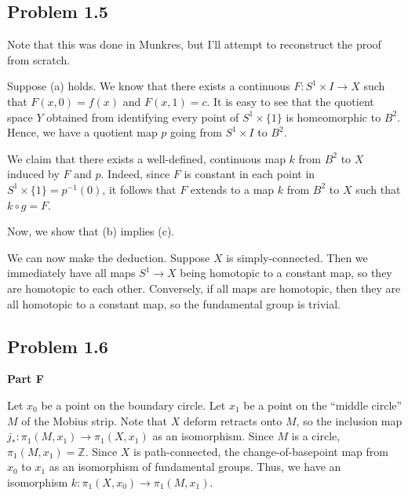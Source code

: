 \documentclass[10pt, oneside]{amsart}
\begin{document}
    \hrulefill

    \newpage

    \hrulefill

    \subsection{Problem 1.5}

    Note that this was done in Munkres, but I'll attempt to reconstruct the proof from scratch.
    \newline

    Suppose (a) holds. We know that there exists a continuous $F : S^{1} \times I \rightarrow X$ such that $F(x, 0) = f(x)$ and $F(x, 1) = c$. It is easy to see that the quotient space $Y$
    obtained from identifying every point of $S^{1} \times \{1\}$ is homeomorphic to $B^2$. Hence, we have a quotient map $p$ going from $S^{1} \times I$ to $B^2$.
    \newline

    We claim that there exists a well-defined, continuous map $k$ from $B^2$ to $X$ induced by $F$ and $p$. Indeed, since $F$ is constant in each point in $S^{1} \times \{1\} = p^{-1}(0)$,
    it follows that $F$ extends to a map $k$ from $B^2$ to $X$ such that $k \circ g = F$.
    \newline

    Now, we show that (b) implies (c).
    \newline

    We can now make the deduction. Suppose $X$ is simply-connected. Then we immediately have all maps $S^1 \rightarrow X$ being homotopic to a constant map, so they are homotopic to each other.
    Conversely, if all maps are homotopic, then they are all homotopic to a constant map, so the fundamental group is trivial.

    \subsection{Problem 1.6}

    \hrulefill

     \textbf{Part F}
    \newline

    Let $x_0$ be a point on the boundary circle. Let $x_1$ be a point on the ``middle circle'' $M$ of the Mobius strip. Note that $X$ deform retracts onto $M$, so the
    inclusion map $j_{*} : \pi_1(M, x_1) \rightarrow \pi_1(X, x_1)$ as an isomorphism. Since $M$ is a circle, $\pi_1(M, x_1) = \mathbb{Z}$.
    Since $X$ is path-connected, the change-of-basepoint map from $x_0$ to $x_1$ as an isomorphism of fundamental groups. Thus, we have an isomorphism $k : \pi_1(X, x_0) \rightarrow \pi_1(M, x_1)$.
    \newline
\end{document}
